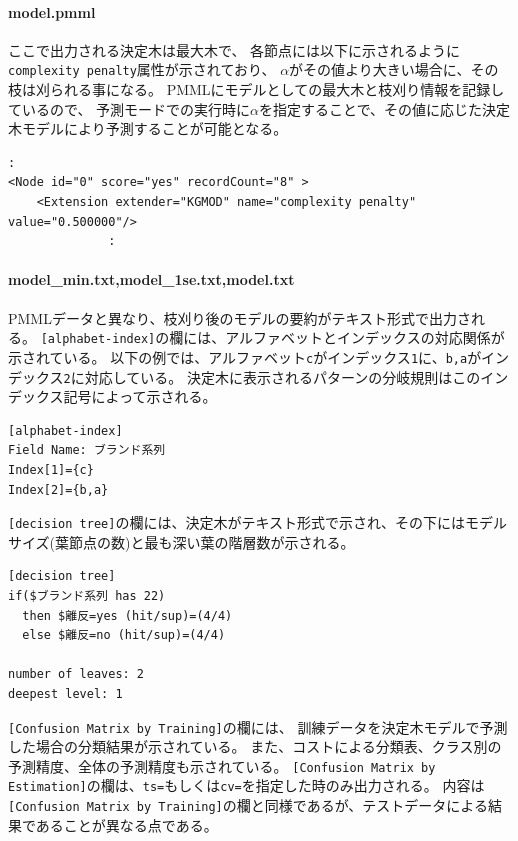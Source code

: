 \begin{table}[htbp]
\begin{center}
\begin{tabular}{ll}
\end{tabular} 
\end{center}
\end{table} 

\paragraph{model.pmml}
ここで出力される決定木は最大木で、
各節点には以下に示されるように\verb|complexity penalty|属性が示されており、
$\alpha$がその値より大きい場合に、その枝は刈られる事になる。
PMMLにモデルとしての最大木と枝刈り情報を記録しているので、
予測モードでの実行時に$\alpha$を指定することで、その値に応じた決定木モデルにより予測することが可能となる。
\begin{Verbatim}[baselinestretch=0.7,frame=single]
              :
<Node id="0" score="yes" recordCount="8" >
    <Extension extender="KGMOD" name="complexity penalty" value="0.500000"/>
              :
\end{Verbatim}

\paragraph{model\_min.txt,model\_1se.txt,model.txt}
PMMLデータと異なり、枝刈り後のモデルの要約がテキスト形式で出力される。
\verb|[alphabet-index]|の欄には、アルファベットとインデックスの対応関係が示されている。
以下の例では、アルファベット\verb|c|がインデックス\verb|1|に、\verb|b,a|がインデックス\verb|2|に対応している。
決定木に表示されるパターンの分岐規則はこのインデックス記号によって示される。
\begin{Verbatim}[baselinestretch=0.7,frame=single]
[alphabet-index]
Field Name: ブランド系列
Index[1]={c}
Index[2]={b,a}
\end{Verbatim}
\verb|[decision tree]|の欄には、決定木がテキスト形式で示され、その下にはモデルサイズ(葉節点の数)と最も深い葉の階層数が示される。
\begin{Verbatim}[baselinestretch=0.7,frame=single]
[decision tree]
if($ブランド系列 has 22)
  then $離反=yes (hit/sup)=(4/4)
  else $離反=no (hit/sup)=(4/4)

number of leaves: 2
deepest level: 1
\end{Verbatim}

\verb|[Confusion Matrix by Training]|の欄には、
訓練データを決定木モデルで予測した場合の分類結果が示されている。
また、コストによる分類表、クラス別の予測精度、全体の予測精度も示されている。
\verb|[Confusion Matrix by Estimation]|の欄は、\verb|ts=|もしくは\verb|cv=|を指定した時のみ出力される。
内容は\verb|[Confusion Matrix by Training]|の欄と同様であるが、テストデータによる結果であることが異なる点である。

